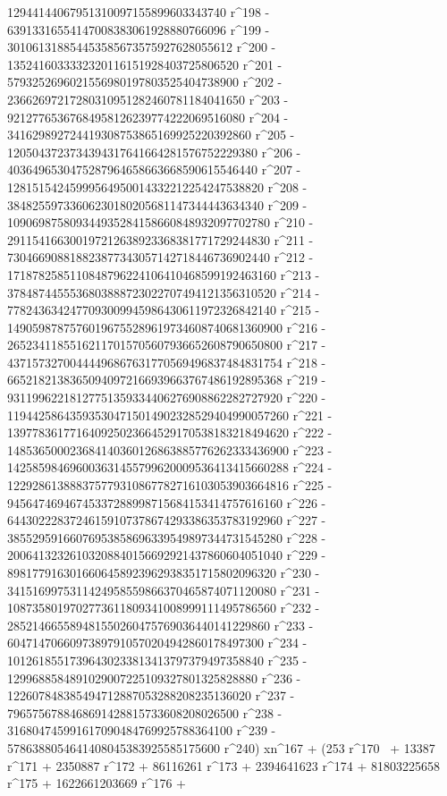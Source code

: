        12944144067951310097155899603343740 r^198 - 
       63913316554147008383061928880766096 r^199 - 
       301061318854453585673575927628055612 r^200 - 
       1352416033332320116151928403725806520 r^201 - 
       5793252696021556980197803525404738900 r^202 - 
       23662697217280310951282460781184041650 r^203 - 
       92127765367684958126239774222069516080 r^204 - 
       341629892724419308753865169925220392860 r^205 - 
       1205043723734394317641664281576752229380 r^206 - 
       4036496530475287964658663668590615546440 r^207 - 
       12815154245999564950014332212254247538820 r^208 - 
       38482559733606230180205681147344443634340 r^209 - 
       109069875809344935284158660848932097702780 r^210 - 
       291154166300197212638923368381771729244830 r^211 - 
       730466908818823877343057142718446736902440 r^212 - 
       1718782585110848796224106410468599192463160 r^213 - 
       3784874455536803888723022707494121356310520 r^214 - 
       7782436342477093009945986430611972326842140 r^215 - 
       14905987875760196755289619734608740681360900 r^216 - 
       26523411855162117015705607936652608790650800 r^217 - 
       43715732700444496867631770569496837484831754 r^218 - 
       66521821383650940972166939663767486192895368 r^219 - 
       93119962218127751359334406276908862282727920 r^220 - 
       119442586435935304715014902328529404990057260 r^221 - 
       139778361771640925023664529170538183218494620 r^222 - 
       148536500023684140360126863885776262333436900 r^223 - 
       142585984696003631455799620009536413415660288 r^224 - 
       122928613888375779310867782716103053903664816 r^225 - 
       94564746946745337288998715684153414757616160 r^226 - 
       64430222837246159107378674293386353783192960 r^227 - 
       38552959166076953858696339549897344731545280 r^228 - 
       20064132326103208840156692921437860604051040 r^229 - 
       8981779163016606458923962938351715802096320 r^230 - 
       3415169975311424958559866370465874071120080 r^231 - 
       1087358019702773611809341008999111495786560 r^232 - 
       285214665589481550260475769036440141229860 r^233 - 
       60471470660973897910570204942860178497300 r^234 - 
       10126185517396430233813413797379497358840 r^235 - 
       1299688584891029007225109327801325828880 r^236 - 
       122607848385494712887053288208235136020 r^237 - 
       7965756788468691428815733608208026500 r^238 - 
       316804745991617090484769925788364100 r^239 - 
       5786388054641408045383925585175600 r^240) xn^167 + (253 r^170 \
+ 13387 r^171 + 2350887 r^172 + 86116261 r^173 + 2394641623 r^174 + 
       81803225658 r^175 + 1622661203669 r^176 + 
